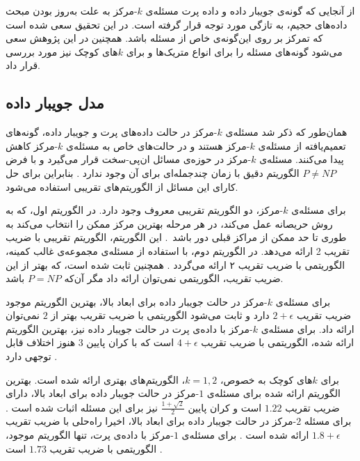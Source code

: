 از آنجایی که گونه‌ی جویبار داده و داده پرت مسئله‌ی $k$-مرکز به علت به‌روز بودن مبحث داده‌های حجیم، به تازگی مورد توجه قرار گرفته است.
در این تحقیق سعی شده است که تمرکز بر روی این‌گونه‌ی خاص از مسئله باشد.
همچنین در این پژوهش سعی می‌شود گونه‌های مسئله را برای انواع متریک‌ها و برای $k$های کوچک نیز مورد بررسی قرار داد.

\subsection{مدل جویبار داده}

همان‌طور که ذکر شد مسئله‌ی $k$-مرکز در حالت داده‌های پرت و جویبار داده، گونه‌های تعمیم‌یافته از مسئله‌ی $k$-مرکز هستند و در حالت‌های خاص به مسئله‌ی $k$-مرکز کاهش پیدا می‌کنند.
مسئله‌ی $k$-مرکز در حوزه‌ی مسائل ان‌پی-سخت قرار می‌گیرد و با فرض $P \neq NP$ الگوریتم دقیق با زمان چندجمله‌ای برای آن وجود ندارد .
بنابراین برای حل کارای این مسائل از الگوریتم‌های تقریبی استفاده می‌شود.

برای مسئله‌ی $k$-مرکز، دو الگوریتم تقریبی معروف وجود دارد.
در الگوریتم اول، که به روش حریصانه عمل می‌کند، در هر مرحله بهترین مرکز ممکن را انتخاب می‌کند به طوری تا حد ممکن از مراکز قبلی دور باشد~.
این الگوریتم، الگوریتم تقریبی با ضریب تقریب 2 ارائه می‌دهد.
در الگوریتم دوم، با استفاده از مسئله‌ی مجموعه‌ی غالب کمینه، الگوریتمی با ضریب تقریب ۲ ارائه می‌گردد .
همچنین ثابت شده است، که بهتر از این ضریب تقریب، الگوریتمی نمی‌توان ارائه داد مگر آن‌که $P = NP$ باشد.

برای مسئله‌ی $k$-مرکز در حالت جویبار داده برای ابعاد بالا، بهترین الگوریتم موجود ضریب تقریب $2 + \epsilon$ دارد  و ثابت می‌شود الگوریتمی با ضریب تقریب بهتر از $2$ نمی‌توان ارائه داد. برای مسئله‌ی $k$-مرکز با داده‌ی پرت در حالت جویبار داده نیز، بهترین الگوریتم ارائه شده، الگوریتمی با ضریب تقریب $4 + \epsilon$ است که با کران پایین $3$ هنوز اختلاف قابل توجهی دارد .

برای $k$های کوچک به خصوص، $k =1, 2$، الگوریتم‌های بهتری ارائه شده است. بهترین الگوریتم ارائه شده برای مسئله‌ی $1$-مرکز در حالت جویبار داده برای ابعاد بالا، دارای ضریب تقریب $1.22$ است و کران پایین $\frac{1 + \sqrt{2}}{2}$ نیز برای این مسئله اثبات شده است . برای مسئله $2$-مرکز در حالت جویبار داده برای ابعاد بالا، اخیرا راه‌حلی با ضریب تقریب $1.8 + \epsilon$ ارائه شده است . برای مسئله‌ی $1$-مرکز با داده‌ی پرت، تنها الگوریتم موجود، الگوریتمی با ضریب تقریب $1.73$ است .

